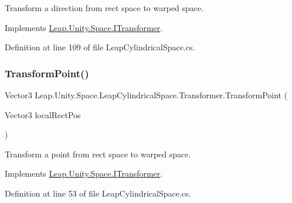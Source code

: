 Transform a direction from rect space to warped space. 



Implements \mbox{\hyperlink{interface_leap_1_1_unity_1_1_space_1_1_i_transformer_a86883dfa18d51d4254dff56b1d9f5024}{Leap.\+Unity.\+Space.\+I\+Transformer}}.



Definition at line 109 of file Leap\+Cylindrical\+Space.\+cs.

\mbox{\label{class_leap_1_1_unity_1_1_space_1_1_leap_cylindrical_space_1_1_transformer_aa912ab55d4e9a20dcbfaff6717f688f9}} 
\subsubsection{\texorpdfstring{TransformPoint()}{TransformPoint()}}
{\footnotesize\ttfamily Vector3 Leap.\+Unity.\+Space.\+Leap\+Cylindrical\+Space.\+Transformer.\+Transform\+Point (\begin{DoxyParamCaption}\item[{Vector3}]{local\+Rect\+Pos }\end{DoxyParamCaption})}



Transform a point from rect space to warped space. 



Implements \mbox{\hyperlink{interface_leap_1_1_unity_1_1_space_1_1_i_transformer_ad4ffef6002e74fe4967c4b7b9d5a5f74}{Leap.\+Unity.\+Space.\+I\+Transformer}}.



Definition at line 53 of file Leap\+Cylindrical\+Space.\+cs.

\mbox{\label{class_leap_1_1_unity_1_1_space_1_1_leap_cylindrical_space_1_1_transformer_afdb282453fb2729b9e8ee426814f6d30}} 
